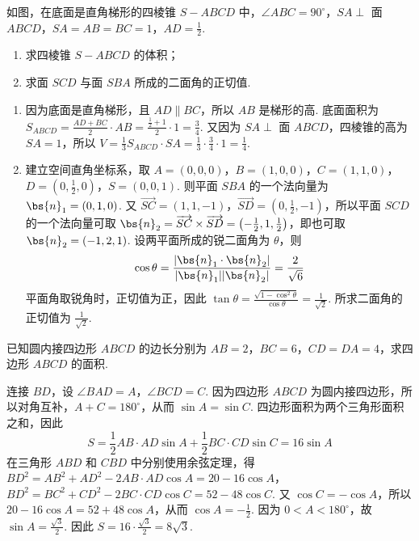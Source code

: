 \begin{problem}
如图，在底面是直角梯形的四棱锥 \(S - ABCD\) 中，\(\angle ABC = 90^{\circ}\)，\(SA \perp\) 面 \(ABCD\)，\(SA = AB = BC = 1\)，\(AD = \frac{1}{2}\).

\begin{enumerate}
\item 求四棱锥 \(S - ABCD\) 的体积；
\item 求面 \(SCD\) 与面 \(SBA\) 所成的二面角的正切值.
\end{enumerate}

\end{problem}

\begin{solution}
\begin{enumerate}
\item 因为底面是直角梯形，且 \(AD\parallel BC\)，所以 \(AB\) 是梯形的高. 底面面积为
\(S_{ABCD}=\frac{AD+BC}{2}\cdot AB=\frac{\frac12+1}{2}\cdot1=\frac34\). 又因为 \(SA\perp\) 面 \(ABCD\)，四棱锥的高为 \(SA=1\)，所以
\(V=\frac13S_{ABCD}\cdot SA=\frac13\cdot\frac34\cdot1=\frac14\).
\item 建立空间直角坐标系，取 \(A=(0,0,0)\)，\(B=(1,0,0)\)，\(C=(1,1,0)\)，\(D=\left(0,\frac12,0\right)\)，\(S=(0,0,1)\). 则平面 \(SBA\) 的一个法向量为 \(\bs{n}_1=(0,1,0)\). 又
\(\overrightarrow{SC}=(1,1,-1)\)，\(\overrightarrow{SD}=\left(0,\frac12,-1\right)\)，所以平面 \(SCD\) 的一个法向量可取 \(\bs{n}_2=\overrightarrow{SC}\times\overrightarrow{SD}=\left(-\frac12,1,\frac12\right)\)，即也可取 \(\bs{n}_2=(-1,2,1)\). 设两平面所成的锐二面角为 \(\theta\)，则
\[
\cos\theta=\frac{|\bs{n}_1\cdot\bs{n}_2|}{|\bs{n}_1||\bs{n}_2|}=\frac{2}{\sqrt{6}}
\]
平面角取锐角时，正切值为正，因此 \(\tan\theta=\frac{\sqrt{1-\cos^2\theta}}{\cos\theta}=\frac{1}{\sqrt{2}}\). 所求二面角的正切值为 \(\frac{1}{\sqrt{2}}\).
\end{enumerate}
\end{solution}

\begin{problem}
已知圆内接四边形 \(ABCD\) 的边长分别为 \(AB = 2\)，\(BC = 6\)，\(CD = DA = 4\)，求四边形 \(ABCD\) 的面积.
\end{problem}

\begin{solution}
连接 \(BD\)，设 \(\angle BAD=A\)，\(\angle BCD=C\). 因为四边形 \(ABCD\) 为圆内接四边形，所以对角互补，\(A+C=180^{\circ}\)，从而 \(\sin A=\sin C\). 四边形面积为两个三角形面积之和，因此
\[
S=\frac12AB\cdot AD\sin A+\frac12BC\cdot CD\sin C=16\sin A
\]
在三角形 \(ABD\) 和 \(CBD\) 中分别使用余弦定理，得
\(BD^2=AB^2+AD^2-2AB\cdot AD\cos A=20-16\cos A\)，
\(BD^2=BC^2+CD^2-2BC\cdot CD\cos C=52-48\cos C\). 又 \(\cos C=-\cos A\)，所以
\(20-16\cos A=52+48\cos A\)，从而 \(\cos A=-\frac12\). 因为 \(0<A<180^{\circ}\)，故 \(\sin A=\frac{\sqrt{3}}{2}\). 因此 \(S=16\cdot\frac{\sqrt{3}}{2}=8\sqrt{3}\).
\end{solution}

